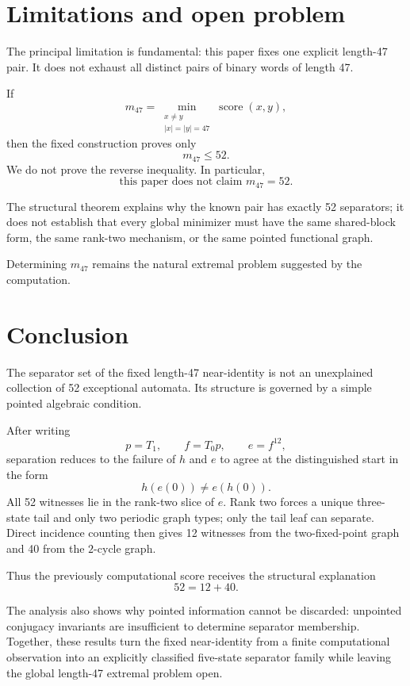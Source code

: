 \documentclass[10pt]{article}
\newcommand{\score}{\operatorname{score}}
\begin{document}
\section{Limitations and open problem}

The principal limitation is fundamental: this paper fixes one explicit length-47 pair. It does not exhaust all distinct pairs of binary words of length 47.

If
\[
m_{47}
=
\min_{\substack{x\neq y\\ |x|=|y|=47}}
\score(x,y),
\]
then the fixed construction proves only
\[
m_{47}\leq52.
\]
We do not prove the reverse inequality. In particular,
\[
\boxed{\text{this paper does not claim }m_{47}=52.}
\]

The structural theorem explains why the known pair has exactly 52 separators; it does not establish that every global minimizer must have the same shared-block form, the same rank-two mechanism, or the same pointed functional graph.

Determining $m_{47}$ remains the natural extremal problem suggested by the computation.

\section{Conclusion}

The separator set of the fixed length-47 near-identity is not an unexplained collection of 52 exceptional automata. Its structure is governed by a simple pointed algebraic condition.

After writing
\[
p=T_1,\qquad f=T_0p,\qquad e=f^{12},
\]
separation reduces to the failure of $h$ and $e$ to agree at the distinguished start in the form
\[
h(e(0))\neq e(h(0)).
\]
All 52 witnesses lie in the rank-two slice of $e$. Rank two forces a unique three-state tail and only two periodic graph types; only the tail leaf can separate. Direct incidence counting then gives 12 witnesses from the two-fixed-point graph and 40 from the $2$-cycle graph.

Thus the previously computational score receives the structural explanation
\[
\boxed{52=12+40}.
\]

The analysis also shows why pointed information cannot be discarded: unpointed conjugacy invariants are insufficient to determine separator membership. Together, these results turn the fixed near-identity from a finite computational observation into an explicitly classified five-state separator family while leaving the global length-47 extremal problem open.
\end{document}
